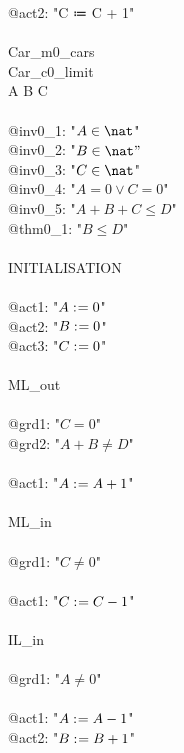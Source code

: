 \begin{description}
\begin{center}
\begin{Bcode}
			@act2: "C ≔ C + 1"\\
			\Bend\\
			\Bend
			\else
			\Bmachine{} Car\_m0_cars\\
			\Bsees{} Car\_c0_limit\\
			\Bvariables{} A B C\\
			\Binvariants\\
			\Btab @inv0_1: "\(A \in \nat\)"\\
			\Btab @inv0_2: "\(B \in \nat"\)\\
			\Btab @inv0_3: "\(C \in \nat\)"\\
			\Btab @inv0_4: "\(A = 0 \vee C = 0\)"\\
			\Btab @inv0_5: "\(A + B + C \leq D\)"\\
			\Btab @thm0_1: "\(B \leq D\)" \Btheorem\\
			\Bevents\\
			\Btab INITIALISATION\\
			\Btab \Bbegin\\
			\Btab \Btab @act1: "\(A \mathrel{:\mkern1mu=} 0\)"\\
			\Btab \Btab @act2: "\(B \mathrel{:\mkern1mu=} 0\)"\\
			\Btab \Btab @act3: "\(C \mathrel{:\mkern1mu=} 0\)"\\
			\Btab \Bend\\
			\Btab ML_out\\
			\Btab \Bwhen\\
			\Btab \Btab @grd1: "\(C = 0\)"\\
			\Btab \Btab @grd2: "\(A + B \neq D\)"\\
			\Btab \Bthen\\
			\Btab \Btab @act1: "\(A \mathrel{:\mkern1mu=} A + 1\)"\\
			\Btab \Bend\\
			\Btab ML_in\\
			\Btab \Bwhen\\
			\Btab \Btab @grd1: "\(C \neq 0\)"\\
			\Btab \Bthen\\
			\Btab \Btab @act1: "\(C \mathrel{:\mkern1mu=} C - 1\)"\\
			\Btab \Bend\\
			\Btab IL_in\\
			\Btab \Bwhen\\
			\Btab \Btab @grd1: "\(A \neq 0\)"\\
			\Btab \Bthen\\
			\Btab \Btab @act1: "\(A \mathrel{:\mkern1mu=} A - 1\)"\\
			\Btab \Btab @act2: "\(B \mathrel{:\mkern1mu=} B + 1\)"\\

\end{Bcode}
\end{center}
\end{description}
